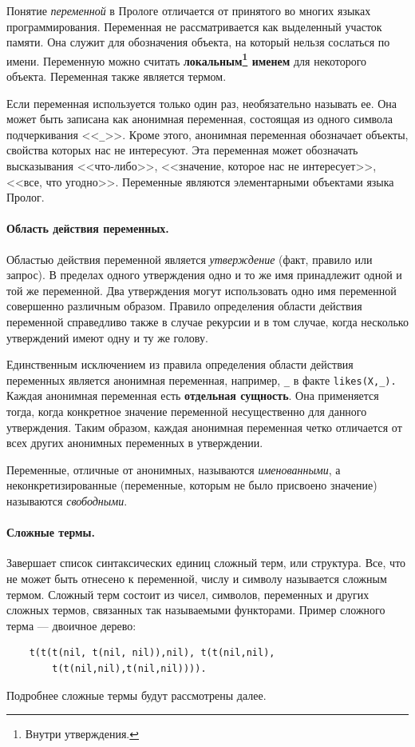 \documentclass[12pt, openany, twoside]{book} %
\begin{document}
Понятие \emph{переменной} в Прологе отличается от принятого во многих  языках программирования. Переменная не рассматривается как выделенный участок памяти. Она служит для обозначения объекта, на который нельзя сослаться по имени. Переменную можно считать {\bf локальным\footnote{Внутри утверждения.} именем} для некоторого объекта. Переменная также является термом.

Если переменная используется только один раз, необязательно называть ее. Она может быть записана как анонимная переменная, состоящая из одного символа подчеркивания <<{\tt \_}>>. Кроме этого, анонимная переменная обозначает объекты, свойства которых нас не интересуют. Эта переменная может обозначать высказывания <<что-либо>>, <<значение, которое нас не интересует>>, <<все, что угодно>>. Переменные являются элементарными объектами языка Пролог.

\paragraph{Область действия переменных.} Областью\linebreak{} действия переменной является \emph{утверждение} (факт, правило или запрос). В пределах одного утверждения одно и то же имя принадлежит одной и той же переменной. Два утверждения могут использовать одно имя переменной совершенно различным образом. Правило определения области действия переменной справедливо также в случае рекурсии и в том случае, когда несколько утверждений имеют одну и ту же голову.

Единственным исключением из правила определения области действия переменных является анонимная переменная, например, {\tt \_} в факте {\tt likes(Х,\_).} Каждая анонимная переменная есть {\bf отдельная сущность}. Она применяется тогда, когда конкретное значение переменной несущественно для данного утверждения. Таким образом, каждая анонимная переменная четко отличается от всех других анонимных переменных в утверждении.

Переменные, отличные от анонимных, называются {\em именованными}, а неконкретизированные (переменные, которым не было присвоено значение) называются {\em свободными}.

\paragraph{Сложные термы.} Завершает список синтаксических единиц сложный терм, или структура. Все, что не может быть отнесено к переменной, числу и символу называется сложным термом. Сложный терм состоит из чисел, символов, переменных и других сложных термов, связанных так называемыми функторами. Пример сложного терма --- двоичное дерево:
{\tt\begin{verbatim}
    t(t(t(nil, t(nil, nil)),nil), t(t(nil,nil),
        t(t(nil,nil),t(nil,nil)))).
\end{verbatim}}
\noindent Подробнее сложные термы будут рассмотрены далее.
\end{document}
